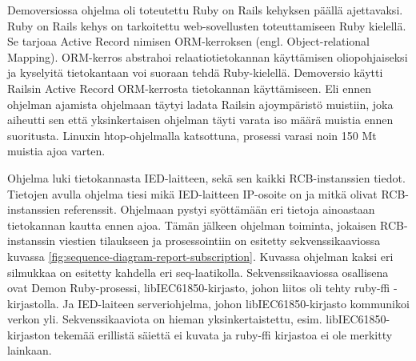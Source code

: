 Demoversiossa ohjelma oli toteutettu Ruby on Rails kehyksen päällä ajettavaksi. Ruby on Rails kehys on tarkoitettu web-sovellusten toteuttamiseen Ruby kielellä. Se tarjoaa Active Record nimisen ORM-kerroksen (engl. Object-relational Mapping). ORM-kerros abstrahoi relaatiotietokannan käyttämisen oliopohjaiseksi ja kyselyitä tietokantaan voi suoraan tehdä Ruby-kielellä. Demoversio käytti Railsin Active Record ORM-kerrosta tietokannan käyttämiseen. Eli ennen ohjelman ajamista ohjelmaan täytyi ladata Railsin ajoympäristö muistiin, joka aiheutti sen että yksinkertaisen ohjelman täyti varata iso määrä muistia ennen suoritusta. Linuxin htop-ohjelmalla katsottuna, prosessi varasi noin 150 Mt muistia ajoa varten.

Ohjelma luki tietokannasta IED-laitteen, sekä sen kaikki RCB-instanssien tiedot. Tietojen avulla ohjelma tiesi mikä IED-laitteen IP-osoite on ja mitkä olivat RCB-instanssien referenssit. Ohjelmaan pystyi syöttämään eri tietoja ainoastaan tietokannan kautta ennen ajoa. Tämän jälkeen ohjelman toiminta, jokaisen RCB-instanssin viestien tilaukseen ja prosessointiin on esitetty sekvenssikaaviossa kuvassa \ref{fig:sequence-diagram-report-subscription}. Kuvassa ohjelman kaksi eri silmukkaa on esitetty kahdella eri seq-laatikolla. Sekvenssikaaviossa osallisena ovat Demon Ruby-prosessi, libIEC61850-kirjasto, johon liitos oli tehty ruby-ffi -kirjastolla. Ja IED-laiteen serveriohjelma, johon libIEC61850-kirjasto kommunikoi verkon yli. Sekvenssikaaviota on hieman yksinkertaistettu, esim. libIEC61850-kirjaston tekemää erillistä säiettä ei kuvata ja ruby-ffi kirjastoa ei ole merkitty lainkaan.

